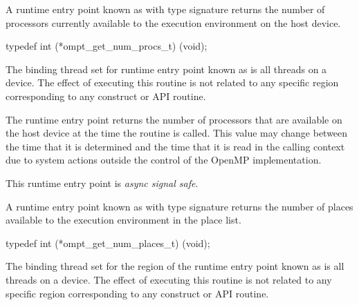 \label{sec:ompt_get_num_procs_t}

\summary

A runtime entry point known as
 with type signature
  returns
the number of processors currently available to the execution
environment on the host device.

\format

\begin{ccppspecific}
\begin{omptInquiry}
typedef int (*ompt_get_num_procs_t) (void);
\end{omptInquiry}
\end{ccppspecific}


\binding

The binding thread set for runtime entry point known as
 is all threads on a device. The effect
of executing this routine is not related to any specific region
corresponding to any construct or API routine.

\descr
The  runtime entry point returns the
number of processors that are available on the host device at the time
the routine is called. This value may change between the time that
it is determined and the time that it is read in the calling context due to
system actions outside the control of the OpenMP implementation.

This runtime entry point is \emph{async signal safe}.


\label{sec:ompt_get_num_places_t}
\label{sec:ompt_get_num_place}

\summary

A runtime entry point known as
 with type signature
  returns
the number of places available to the execution
environment in the place list.

\format

\begin{ccppspecific}
\begin{omptInquiry}
typedef int (*ompt_get_num_places_t) (void);
\end{omptInquiry}
\end{ccppspecific}


\binding

The binding thread set for the region
of the runtime entry point known as 
is all threads on a device. The effect of executing this
routine is not related to any specific region corresponding
to any construct or API routine.

